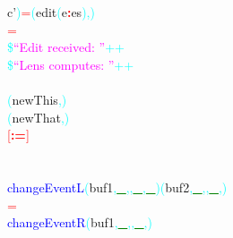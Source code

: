 {\rm{}c'}\textcolor{cyan}{)}\hsspace \hsspace \textcolor{red}{=}\hsspace \textcolor{cyan}{(}{\rm{}edit}\hsspace \textcolor{cyan}{(}{\rm{}e}\textcolor{red}{{\bf{}:}}{\rm{}es}\textcolor{cyan}{)}\textcolor{cyan}{,}\textcolor{cyan}{)}\\\hstab \hstab \hstab \hsspace \hsspace \hsspace {}\hsspace \textcolor{red}{=}\\\hstab \hstab {}\hsspace \textcolor{cyan}{\$}\hsspace \textcolor{magenta}{``Edit received: ''}\hsspace \textcolor{cyan}{++}\\\hstab \hstab {}\hsspace \textcolor{cyan}{\$}\hsspace \textcolor{magenta}{``Lens computes: ''}\hsspace \textcolor{cyan}{++}\\\hstab \hstab {}\\\hstab \hstab {}\hsspace \textcolor{cyan}{(}{\rm{}newThis}\textcolor{cyan}{,}\hsspace {\rm{}[]}\textcolor{cyan}{)}\\\hstab \hstab {}\hsspace \textcolor{cyan}{(}{\rm{}newThat}\textcolor{cyan}{,}\hsspace {\rm{}[]}\textcolor{cyan}{)}\\\hstab \hstab {}\hsspace \textcolor{red}{[}\hsspace \textcolor{red}{{\bf{}:=}}\hsspace \textcolor{red}{]}\\\\\\\textcolor{blue}{changeEventL}\hsspace \textcolor{cyan}{(}{\rm{}buf1}\textcolor{cyan}{,}\hsspace \textcolor{green}{\underline{\_}}\textcolor{cyan}{,}\textcolor{cyan}{,}\hsspace \textcolor{green}{\underline{\_}}\textcolor{cyan}{,}\hsspace \textcolor{green}{\underline{\_}}\textcolor{cyan}{)}\hsspace \textcolor{cyan}{(}{\rm{}buf2}\textcolor{cyan}{,}\hsspace \textcolor{green}{\underline{\_}}\textcolor{cyan}{,}\textcolor{cyan}{,}\hsspace \textcolor{green}{\underline{\_}}\textcolor{cyan}{,}\textcolor{cyan}{)}\\\hstab \textcolor{red}{=}\\\textcolor{blue}{changeEventR}\hsspace \textcolor{cyan}{(}{\rm{}buf1}\textcolor{cyan}{,}\hsspace \textcolor{green}{\underline{\_}}\textcolor{cyan}{,}\textcolor{cyan}{,}\hsspace \textcolor{green}{\underline{\_}}\textcolor{cyan}{,}\textcolor{cyan}{)}\hsspace 